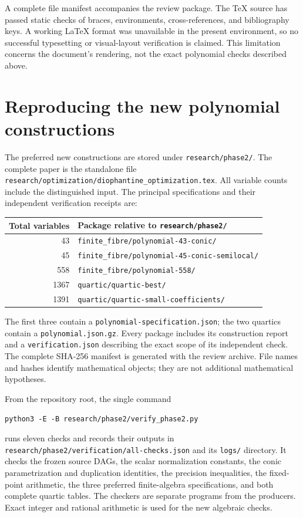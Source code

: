 \documentclass[11pt]{article}
\theoremstyle{definition}
\begin{document}
A complete file manifest accompanies the review package. The TeX source
has passed static checks of braces, environments, cross-references, and
bibliography keys. A working LaTeX format was unavailable in the present
environment, so no successful typesetting or visual-layout verification
is claimed. This limitation concerns the document's rendering, not the
exact polynomial checks described above.


\section{Reproducing the new polynomial constructions}
\label{sec:phase2-reproducibility}

The preferred new constructions are stored under
\nolinkurl{research/phase2/}. The complete paper is the standalone file
\nolinkurl{research/optimization/diophantine_optimization.tex}.
All variable counts include the distinguished input. The principal
specifications and their independent verification receipts are:
\begin{center}
\small
\begin{tabular}{r p{82mm}}
\toprule
Total variables & Package relative to \texttt{research/phase2/}\\
\midrule
43 & \nolinkurl{finite_fibre/polynomial-43-conic/}\\
45 & \nolinkurl{finite_fibre/polynomial-45-conic-semilocal/}\\
558 & \nolinkurl{finite_fibre/polynomial-558/}\\
1367 & \nolinkurl{quartic/quartic-best/}\\
1391 & \nolinkurl{quartic/quartic-small-coefficients/}\\
\bottomrule
\end{tabular}
\end{center}
The first three contain a
\nolinkurl{polynomial-specification.json}; the two quartics contain a
\nolinkurl{polynomial.json.gz}. Every package includes its construction
report and a \nolinkurl{verification.json} describing the exact scope
of its independent check. The complete SHA-256 manifest is generated
with the review archive. File names and hashes identify mathematical
objects; they are not additional mathematical hypotheses.

From the repository root, the single command
\begin{verbatim}
python3 -E -B research/phase2/verify_phase2.py
\end{verbatim}
runs eleven checks and records their outputs in
\nolinkurl{research/phase2/verification/all-checks.json} and its
\nolinkurl{logs/} directory. It checks the frozen source DAGs,
the scalar normalization constants, the conic parametrization and
duplication identities, the precision inequalities, the fixed-point
arithmetic, the three preferred finite-algebra specifications, and
both complete quartic tables. The checkers are separate programs from
the producers. Exact integer and rational arithmetic is used for the
new algebraic checks.
\end{document}
